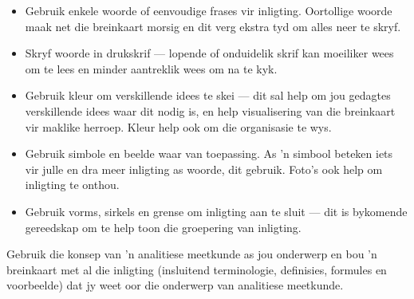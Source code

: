 \begin{itemize}[noitemsep]
\item
  Gebruik enkele woorde of eenvoudige frases vir inligting. Oortollige
  woorde maak net die breinkaart morsig en dit verg ekstra tyd om
  alles neer te skryf.
\item
Skryf woorde in drukskrif --- lopende of onduidelik skrif kan
moeiliker wees om te lees en minder aantreklik wees om na te kyk.
\item
  Gebruik kleur om verskillende idees te skei --- dit sal help om jou
  gedagtes verskillende idees waar dit nodig is, en help visualisering
  van die breinkaart vir maklike herroep. Kleur help ook om die
  organisasie te wys.
\item
  Gebruik simbole en beelde waar van toepassing. As 'n simbool beteken
  iets vir julle en dra meer inligting as woorde, dit gebruik. Foto's
  ook help om inligting te onthou.
\item
  Gebruik vorms, sirkels en grense om inligting aan te sluit --- dit
  is bykomende gereedskap om te help toon die groepering van
  inligting.
\end{itemize}
Gebruik die konsep van 'n analitiese meetkunde as jou onderwerp en
bou 'n breinkaart met al die inligting (insluitend terminologie,
definisies, formules en voorbeelde) dat jy weet oor die onderwerp van
analitiese meetkunde.

